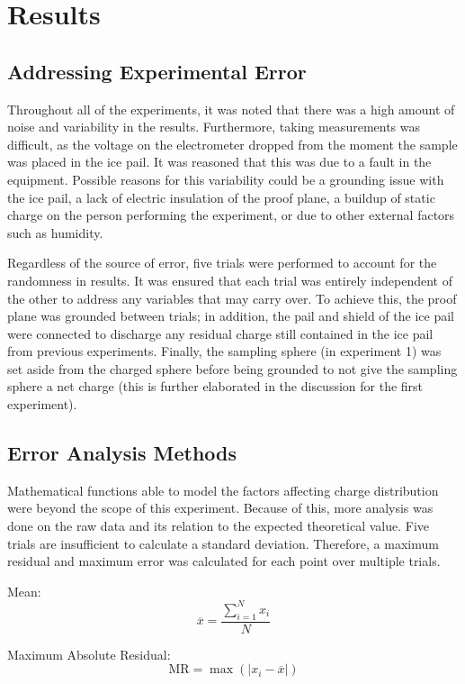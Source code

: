 \section{Results}


\subsection{Addressing Experimental Error}

Throughout all of the experiments, it was noted that there was a high amount of noise and variability in the results. Furthermore, taking measurements was difficult, as the voltage on the electrometer dropped from the moment the sample was placed in the ice pail. It was reasoned that this was due to a fault in the equipment. Possible reasons for this variability could be a grounding issue with the ice pail, a lack of electric insulation of the proof plane, a buildup of static charge on the person performing the experiment, or due to other external factors such as humidity.

Regardless of the source of error, five trials were performed to account for the randomness in results. It was ensured that each trial was entirely independent of the other to address any variables that may carry over. To achieve this, the proof plane was grounded between trials; in addition, the pail and shield of the ice pail were connected to discharge any residual charge still contained in the ice pail from previous experiments. Finally, the sampling sphere (in experiment 1) was set aside from the charged sphere before being grounded to not give the sampling sphere a net charge (this is further elaborated in the discussion for the first experiment).

\subsection{Error Analysis Methods}

Mathematical functions able to model the factors affecting charge distribution were beyond the scope of this experiment. Because of this, more analysis was done on the raw data and its relation to the expected theoretical value. Five trials are insufficient to calculate a standard deviation. Therefore, a maximum residual and maximum error was calculated for each point over multiple trials.

Mean:
$$  \overline{x} =\frac{\sum_{i=1}^{N} x_i  }{N}$$

Maximum Absolute Residual: 
$$\mathrm{MR}=\max \left(\left|x_i -\overline{x} \right|\right)$$

